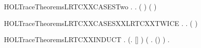 \newcommand{\HOLTraceTheoremsLRTCXXCASESOne}{\UseVerbatim{HOLTraceTheoremsLRTCXXCASESOne}}
\begin{SaveVerbatim}{HOLTraceTheoremsLRTCXXCASESTwo}
\HOLTokenTurnstile{} \HOLSymConst{\HOLTokenForall{}}   .
            \HOLSymConst{\HOLTokenEquiv{}}
            \HOLSymConst{=} 
        \HOLSymConst{\HOLTokenExists{}}.    ( )  \HOLSymConst{\HOLTokenConj{}}   ( ) 
\end{SaveVerbatim}
\newcommand{\HOLTraceTheoremsLRTCXXCASESTwo}{\UseVerbatim{HOLTraceTheoremsLRTCXXCASESTwo}}
\begin{SaveVerbatim}{HOLTraceTheoremsLRTCXXCASESXXLRTCXXTWICE}
\HOLTokenTurnstile{} \HOLSymConst{\HOLTokenForall{}}   .
            \HOLSymConst{\HOLTokenEquiv{}}
       \HOLSymConst{\HOLTokenExists{}}  .      \HOLSymConst{\HOLTokenConj{}}      \HOLSymConst{\HOLTokenConj{}} ( \HOLSymConst{=}  \HOLSymConst{++} )
\end{SaveVerbatim}
\newcommand{\HOLTraceTheoremsLRTCXXCASESXXLRTCXXTWICE}{\UseVerbatim{HOLTraceTheoremsLRTCXXCASESXXLRTCXXTWICE}}
\begin{SaveVerbatim}{HOLTraceTheoremsLRTCXXINDUCT}
\HOLTokenTurnstile{} \HOLSymConst{\HOLTokenForall{}} .
       (\HOLSymConst{\HOLTokenForall{}}.   [] ) \HOLSymConst{\HOLTokenConj{}}
       (\HOLSymConst{\HOLTokenForall{}}    .     \HOLSymConst{\HOLTokenConj{}}     \HOLSymConst{\HOLTokenImp{}}   (\HOLSymConst{::}) ) \HOLSymConst{\HOLTokenImp{}}
       \HOLSymConst{\HOLTokenForall{}}  .      \HOLSymConst{\HOLTokenImp{}}    
\end{SaveVerbatim}
